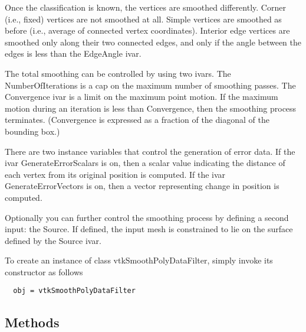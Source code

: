  Once the classification is known, the vertices are smoothed
 differently. Corner (i.e., fixed) vertices are not smoothed at all. 
 Simple vertices are smoothed as before (i.e., average of connected 
 vertex coordinates). Interior edge vertices are smoothed only along 
 their two connected edges, and only if the angle between the edges 
 is less than the EdgeAngle ivar.

 The total smoothing can be controlled by using two ivars. The 
 NumberOfIterations is a cap on the maximum number of smoothing passes.
 The Convergence ivar is a limit on the maximum point motion. If the 
 maximum motion during an iteration is less than Convergence, then the 
 smoothing process terminates. (Convergence is expressed as a fraction of 
 the diagonal of the bounding box.)

 There are two instance variables that control the generation of error
 data. If the ivar GenerateErrorScalars is on, then a scalar value indicating
 the distance of each vertex from its original position is computed. If the
 ivar GenerateErrorVectors is on, then a vector representing change in 
 position is computed.

 Optionally you can further control the smoothing process by defining a
 second input: the Source. If defined, the input mesh is constrained to
 lie on the surface defined by the Source ivar.


To create an instance of class vtkSmoothPolyDataFilter, simply
invoke its constructor as follows
\begin{verbatim}
  obj = vtkSmoothPolyDataFilter
\end{verbatim}
\subsection{Methods}

